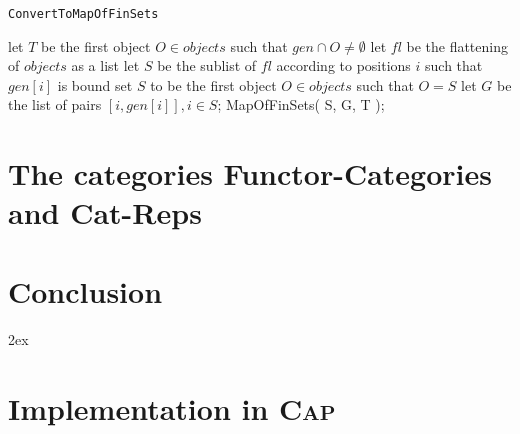 \documentclass{article}
\begin{document}
\begin{algorithm}\capstart
   \caption{\texttt{ConvertToMapOfFinSets}}\label{algo:ConvertToMapOfFinSets}
      \BlankLine
      let $T$ be the first object $O \in objects$ such that $gen \cap O \not= \emptyset$\;
      let $fl$ be the flattening of $objects$ as a list\;
      let $S$ be the sublist of $fl$ according to positions $i$ such that $gen[i]$ is bound\;
      set $S$ to be the first object $O \in objects$ such that $O = S$\;
      \BlankLine
      let $G$ be the list of pairs $[ i, gen[i] ], i \in S$;
      \BlankLine
      \Return MapOfFinSets( S, G, T );
\end{algorithm}

\section{The categories Functor-Categories and Cat-Reps}
\section{Conclusion}


\begingroup
     \parindent 0pt
     \parskip 2ex
     \def\enotesize{\normalsize}
     \theendnotes
\endgroup 



\appendix
\renewcommand{\thesection}{\Alph{section}}
\section{Implementation in \textsc{Cap}}

\end{document}
